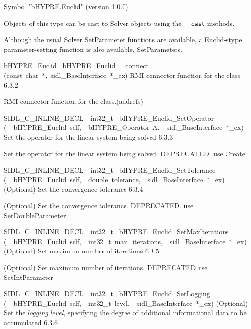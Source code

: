 \documentclass{article}
\begin{document}
\begin{cxxentry}
\begin{cxxentry}
\begin{cxxvariable}
\begin{cxxdoc}
Symbol "bHYPRE.Euclid" (version 1.0.0)

Objects of this type can be cast to Solver objects using the
{\tt \_\_cast} methods.

Although the usual Solver SetParameter functions are available,
a Euclid-stype parameter-setting function is also available, SetParameters.
\end{cxxdoc}
\end{cxxvariable}
\begin{cxxfunction}
{bHYPRE\_Euclid\ }
        {bHYPRE\_Euclid\_\_connect}
        {(const\ char\ *,\ sidl\_BaseInterface\ *\_ex)}
        {
RMI connector function for the class}
        {6.3.2}
\begin{cxxdoc}

RMI connector function for the class.(addrefs)
\end{cxxdoc}
\end{cxxfunction}
\begin{cxxfunction}
{SIDL\_C\_INLINE\_DECL\ \ int32\_t\ }
        {bHYPRE\_Euclid\_SetOperator}
        {(\ \ bHYPRE\_Euclid\ self,\ \ bHYPRE\_Operator\ A,\ \ sidl\_BaseInterface\ *\_ex)}
        {
Set the operator for the linear system being solved}
        {6.3.3}
\begin{cxxdoc}

Set the operator for the linear system being solved.
DEPRECATED.  use Create
\end{cxxdoc}
\end{cxxfunction}
\begin{cxxfunction}
{SIDL\_C\_INLINE\_DECL\ \ int32\_t\ }
        {bHYPRE\_Euclid\_SetTolerance}
        {(\ \ bHYPRE\_Euclid\ self,\ \ double\ tolerance,\ \ sidl\_BaseInterface\ *\_ex)}
        {
(Optional) Set the convergence tolerance}
        {6.3.4}
\begin{cxxdoc}

(Optional) Set the convergence tolerance.
DEPRECATED.  use SetDoubleParameter
\end{cxxdoc}
\end{cxxfunction}
\begin{cxxfunction}
{SIDL\_C\_INLINE\_DECL\ \ int32\_t\ }
        {bHYPRE\_Euclid\_SetMaxIterations}
        {(\ \ bHYPRE\_Euclid\ self,\ \ int32\_t\ max\_iterations,\ \ sidl\_BaseInterface\ *\_ex)}
        {
(Optional) Set maximum number of iterations}
        {6.3.5}
\begin{cxxdoc}

(Optional) Set maximum number of iterations.
DEPRECATED   use SetIntParameter
\end{cxxdoc}
\end{cxxfunction}
\begin{cxxfunction}
{SIDL\_C\_INLINE\_DECL\ \ int32\_t\ }
        {bHYPRE\_Euclid\_SetLogging}
        {(\ \ bHYPRE\_Euclid\ self,\ \ int32\_t\ level,\ \ sidl\_BaseInterface\ *\_ex)}
        {
(Optional) Set the {\it logging level}, specifying the degree
of additional informational data to be accumulated}
        {6.3.6}
\begin{cxxdoc}


\end{cxxdoc}
\end{cxxfunction}
\end{cxxentry}
\end{cxxentry}
\end{document}
